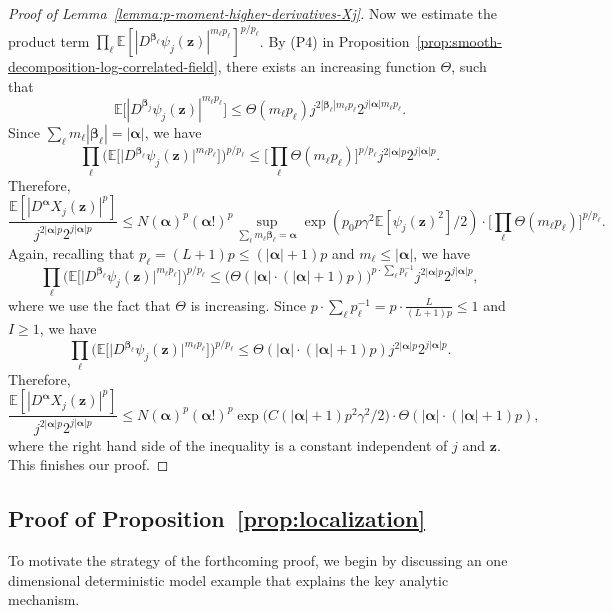 \documentclass[12pt]{amsart}
\theoremstyle{definition}
\theoremstyle{remark}
\newcommand{\bz}{\boldsymbol{z}}
\newcommand{\E}{\mathbb{E}}
\numberwithin{equation}{section}
\begin{document}
\begin{proof}[Proof of Lemma~\ref{lemma:p-moment-higher-derivatives-Xj}]
Now we estimate the product term $\prod_\ell \E[|D^{\boldsymbol{\beta}_\ell}\psi_j(\bz)|^{m_\ell p_\ell}]^{p/p_\ell}$. By (P4) in Proposition~\ref{prop:smooth-decomposition-log-correlated-field}, there exists an increasing function $\Theta$, such that
\[
\E\big[|D^{\boldsymbol{\beta}_j}\psi_j(\bz)|^{m_\ell p_\ell}\big]\le \Theta(m_\ell p_\ell) j^{2|\boldsymbol{\beta}_\ell |m_\ell p_\ell}2^{j|\boldsymbol{\alpha}|m_\ell p_\ell}.
\]
Since $\sum_\ell m_\ell |\boldsymbol{\beta}_\ell|=|\boldsymbol{\alpha}|$, we have
\[
\prod_{\ell}\Big(\E\big[\big|D^{\boldsymbol{\beta}_{\ell}}\psi_j(\bz)\big|^{m_\ell p_\ell}\big]\Big)^{p/p_\ell}\le \bigg[\prod_\ell \Theta(m_\ell p_\ell)\bigg]^{p/p_\ell} j^{2|\boldsymbol{\alpha}|p}2^{j|\boldsymbol{\alpha}|p}.
\]
Therefore,
\[
\frac{\E[|D^{\boldsymbol{\alpha}} X_j(\bz)|^p]}{j^{2|\boldsymbol{\alpha}|p}2^{j|\boldsymbol{\alpha}|p}}\le N(\boldsymbol{\alpha})^p(\boldsymbol{\alpha}!)^p\sup_{\sum_\ell m_\ell \boldsymbol{\beta}_\ell=\boldsymbol{\alpha}}\exp(p_0p\gamma^2\E[\psi_j(\bz)^2]/2)\cdot\bigg[\prod_\ell \Theta(m_\ell p_\ell)\bigg]^{p/p_\ell}.
\]
Again, recalling that $p_\ell=(L+1)p\le (|\boldsymbol{\alpha}|+1)p$ and $m_\ell\le |\boldsymbol{\alpha}|$, we have
\[
\prod_{\ell}\Big(\E\big[\big|D^{\boldsymbol{\beta}_{\ell}}\psi_j(\bz)\big|^{m_\ell p_\ell}\big]\Big)^{p/p_\ell}\le \big(\Theta(|\boldsymbol{\alpha}|\cdot (|\boldsymbol{\alpha}|+1)p)\big)^{p\cdot \sum_\ell p_\ell^{-1}}j^{2|\boldsymbol{\alpha}|p}2^{j|\boldsymbol{\alpha}|p},
\]
where we use the fact that $\Theta$ is increasing. Since $p\cdot \sum_{\ell}p_\ell^{-1}=p\cdot \frac{L}{(L+1)p}\le 1$ and $I\ge 1$, we have
\[
\prod_{\ell}\Big(\E\big[\big|D^{\boldsymbol{\beta}_{\ell}}\psi_j(\bz)\big|^{m_\ell p_\ell}\big]\Big)^{p/p_\ell}\le \Theta(|\boldsymbol{\alpha}|\cdot (|\boldsymbol{\alpha}|+1)p)j^{2|\boldsymbol{\alpha}|p}2^{j|\boldsymbol{\alpha}|p}.
\]
Therefore,
\[
\frac{\E[|D^{\boldsymbol{\alpha}}X_j(\bz)|^p]}{j^{2|\boldsymbol{\alpha}|p}2^{j|\boldsymbol{\alpha}|p}}\le N(\boldsymbol{\alpha})^p(\boldsymbol{\alpha}!)^p \exp\Big(C(|\boldsymbol{\alpha}|+1)p^2\gamma^2/2\Big)\cdot \Theta(|\boldsymbol{\alpha}|\cdot (|\boldsymbol{\alpha}|+1)p),
\]
where the right hand side of the inequality is a constant independent of $j$ and $\bz$. This finishes our proof.
\end{proof}


\subsection{Proof of Proposition~\ref{prop:localization}} To motivate the strategy of the forthcoming proof, we begin by discussing an one dimensional deterministic model example that explains the key analytic mechanism.
\end{document}
